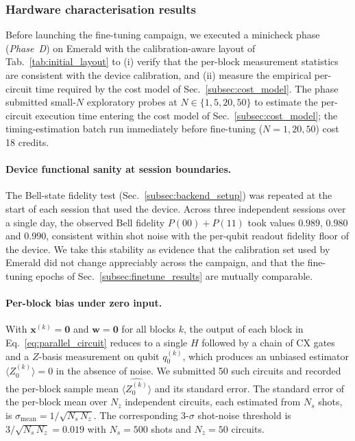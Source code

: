\subsubsection{Hardware characterisation results}
\label{subsec:hw_results}

Before launching the fine-tuning campaign, we executed a minicheck phase (\emph{Phase~D}) on Emerald with the calibration-aware layout of Tab.~\ref{tab:initial_layout} to (i) verify that the per-block measurement statistics are consistent with the device calibration, and (ii) measure the empirical per-circuit time required by the cost model of Sec.~\ref{subsec:cost_model}. The phase submitted small-$N$ exploratory probes at $N\in\{1,5,20,50\}$ to estimate the per-circuit execution time entering the cost model of Sec.~\ref{subsec:cost_model}; the timing-estimation batch run immediately before fine-tuning ($N=1,20,50$) cost 18 credits.

\paragraph{Device functional sanity at session boundaries.}
The Bell-state fidelity test (Sec.~\ref{subsec:backend_setup}) was repeated at the start of each session that used the device. Across three independent sessions over a single day, the observed Bell fidelity $P(00)+P(11)$ took values $0.989$, $0.980$ and $0.990$, consistent within shot noise with the per-qubit readout fidelity floor of the device. We take this stability as evidence that the calibration set used by Emerald did not change appreciably across the campaign, and that the fine-tuning epochs of Sec.~\ref{subsec:finetune_results} are mutually comparable.

\paragraph{Per-block bias under zero input.}
With $\boldsymbol{x}^{(k)}=\mathbf{0}$ and $\boldsymbol{w}=\mathbf{0}$ for all blocks $k$, the output of each block in Eq.~\ref{eq:parallel_circuit} reduces to a single $H$ followed by a chain of CX gates and a $Z$-basis measurement on qubit $q^{(k)}_0$, which produces an unbiased estimator $\langle Z_0^{(k)}\rangle = 0$ in the absence of noise. We submitted 50 such circuits and recorded the per-block sample mean $\widehat{\langle Z_0^{(k)}\rangle}$ and its standard error. The standard error of the per-block mean over $N_z$ independent circuits, each estimated from $N_s$ shots, is $\sigma_{\mathrm{mean}}=1/\sqrt{N_s\,N_z}$. The corresponding 3-$\sigma$ shot-noise threshold is $3/\sqrt{N_s\,N_z}=0.019$ with $N_s=500$ shots and $N_z=50$ circuits.

